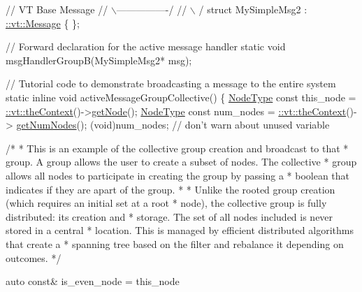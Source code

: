 \begin{DoxyCodeInclude}
\textcolor{comment}{//                  VT Base Message}
\textcolor{comment}{//                 \(\backslash\)----------------/}
\textcolor{comment}{//                  \(\backslash\)              /}
\textcolor{keyword}{struct }MySimpleMsg2 : \hyperlink{structvt_1_1messaging_1_1_active_msg}{::vt::Message} \{ \};

\textcolor{comment}{// Forward declaration for the active message handler}
\textcolor{keyword}{static} \textcolor{keywordtype}{void} msgHandlerGroupB(MySimpleMsg2* msg);

\textcolor{comment}{// Tutorial code to demonstrate broadcasting a message to the entire system}
\textcolor{keyword}{static} \textcolor{keyword}{inline} \textcolor{keywordtype}{void} activeMessageGroupCollective() \{
  \hyperlink{namespacevt_a866da9d0efc19c0a1ce79e9e492f47e2}{NodeType} \textcolor{keyword}{const} this\_node = \hyperlink{namespacevt_a26551fe0e6e6a1371111df5b12c7e92c}{::vt::theContext}()->\hyperlink{structvt_1_1ctx_1_1_context_a0d52c263ce8516546a67443d9a86fa5f}{getNode}();
  \hyperlink{namespacevt_a866da9d0efc19c0a1ce79e9e492f47e2}{NodeType} \textcolor{keyword}{const} num\_nodes = \hyperlink{namespacevt_a26551fe0e6e6a1371111df5b12c7e92c}{::vt::theContext}()->
      \hyperlink{structvt_1_1ctx_1_1_context_a7f41071aadf6d5fa9e1b6c703c5ff19d}{getNumNodes}();
  (void)num\_nodes;  \textcolor{comment}{// don't warn about unused variable}

  \textcolor{comment}{/*}
\textcolor{comment}{   * This is an example of the collective group creation and broadcast to that}
\textcolor{comment}{   * group. A group allows the user to create a subset of nodes. The collective}
\textcolor{comment}{   * group allows all nodes to participate in creating the group by passing a}
\textcolor{comment}{   * boolean that indicates if they are apart of the group.}
\textcolor{comment}{   *}
\textcolor{comment}{   * Unlike the rooted group creation (which requires an initial set at a root}
\textcolor{comment}{   * node), the collective group is fully distributed: its creation and}
\textcolor{comment}{   * storage. The set of all nodes included is never stored in a central}
\textcolor{comment}{   * location. This is managed by efficient distributed algorithms that create a}
\textcolor{comment}{   * spanning tree based on the filter and rebalance it depending on outcomes.}
\textcolor{comment}{   */}

  \textcolor{keyword}{auto} \textcolor{keyword}{const}& is\_even\_node = this\_node %


\end{DoxyCodeInclude}
